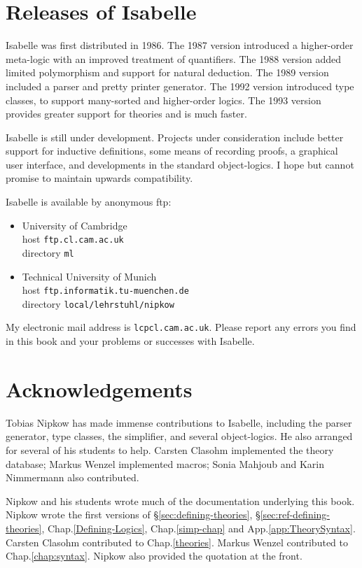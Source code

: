 \section*{Releases of Isabelle}
Isabelle was first distributed in 1986.  The 1987 version introduced a
higher-order meta-logic with an improved treatment of quantifiers.  The
1988 version added limited polymorphism and support for natural deduction.
The 1989 version included a parser and pretty printer generator.  The 1992
version introduced type classes, to support many-sorted and higher-order
logics.  The 1993 version provides greater support for theories and is
much faster.  

Isabelle is still under development.  Projects under consideration include
better support for inductive definitions, some means of recording proofs, a
graphical user interface, and developments in the standard object-logics.
I hope but cannot promise to maintain upwards compatibility.

Isabelle is available by anonymous ftp:
\begin{itemize}
\item University of Cambridge\\
        host {\tt ftp.cl.cam.ac.uk}\\
        directory {\tt ml}

\item Technical University of Munich\\
        host {\tt ftp.informatik.tu-muenchen.de}\\
        directory {\tt local/lehrstuhl/nipkow}
\end{itemize}
My electronic mail address is {\tt lcp\at cl.cam.ac.uk}.  Please report any
errors you find in this book and your problems or successes with Isabelle.


\section*{Acknowledgements} 
Tobias Nipkow has made immense contributions to Isabelle, including the
parser generator, type classes, the simplifier, and several object-logics.
He also arranged for several of his students to help.  Carsten Clasohm
implemented the theory database; Markus Wenzel implemented macros; Sonia
Mahjoub and Karin Nimmermann also contributed.  

Nipkow and his students wrote much of the documentation underlying this
book.  Nipkow wrote the first versions of \S\ref{sec:defining-theories},
\S\ref{sec:ref-defining-theories}, Chap.\ts\ref{Defining-Logics},
Chap.\ts\ref{simp-chap} and App.\ts\ref{app:TheorySyntax}\@.  Carsten
Clasohm contributed to Chap.\ts\ref{theories}.  Markus Wenzel contributed
to Chap.\ts\ref{chap:syntax}.  Nipkow also provided the quotation at
the front.

